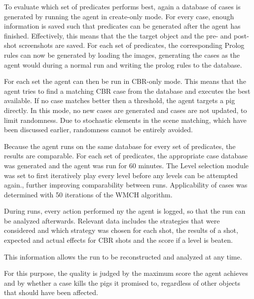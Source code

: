 To evaluate which set of predicates performs best, again a database of cases is generated by running the agent in create-only mode.
For every case, enough information is saved such that predicates can be generated after the agent has finished. Effectively, this means that the the target object and the pre- and post-shot screenshots are saved. For each set of predicates, the corresponding Prolog rules can now be generated by loading the images, generating the cases as the agent would during a normal run and writing the prolog rules to the database.

For each set the agent can then be run in CBR-only mode. This means that the agent tries to find a matching CBR case from the database and executes the best available. If no case matches better then a threshold, the agent targets a pig directly. In this mode, no new cases are generated and cases are not updated, to limit randomness. Due to stochastic elements in the scene matching, which have been discussed earlier, randomness cannot be entirely avoided.

Because the agent runs on the same database for every set of predicates, the results are comparable. For each set of predicates, the appropriate case database was generated and the agent was run for 60 minutes. The Level selection module was set to first iteratively play every level before any levels can be attempted again., further improving comparability between runs.
Applicability of cases was determined with 50 iterations of the \ac{WMCH} algorithm.

During runs, every action performed ny the agent is logged, so that the run can be analyzed afterwards. Relevant data includes the strategies that were considered and which strategy was chosen for each shot, the results of a shot, expected and actual effects for CBR shots and the score if a level is beaten.

This information allows the run to be reconstructed and analyzed at any time.

For this purpose, the quality is judged by the maximum score the agent achieves and by whether a case kills the pigs it promised to, regardless of other objects that should have been affected.
